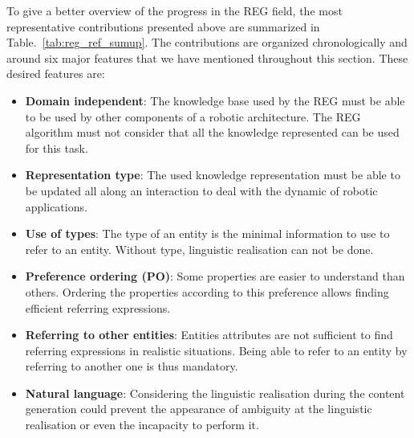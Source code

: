 To give a better overview of the progress in the REG field, the most representative contributions presented above are summarized in Table.~\ref{tab:reg_ref_sumup}. The contributions are organized chronologically and around six major features that we have mentioned throughout this section. These desired features are:
\begin{itemize}
	\item \textbf{Domain independent}: The knowledge base used by the REG must be able to be used by other components of a robotic architecture. The REG algorithm must not consider that all the knowledge represented can be used for this task.
	\item \textbf{Representation type}: The used knowledge representation must be able to be updated all along an interaction to deal with the dynamic of robotic applications.
	\item \textbf{Use of types}: The type of an entity is the minimal information to use to refer to an entity. Without type, linguistic realisation can not be done.
	\item \textbf{Preference ordering (PO)}: Some properties are easier to understand than others. Ordering the properties according to this preference allows finding efficient referring expressions.
	\item \textbf{Referring to other entities}: Entities attributes are not sufficient to find referring expressions in realistic situations. Being able to refer to an entity by referring to another one is thus mandatory.
	\item \textbf{Natural language}: Considering the linguistic realisation during the content generation could prevent the appearance of ambiguity at the linguistic realisation or even the incapacity to perform it.
\end{itemize}

